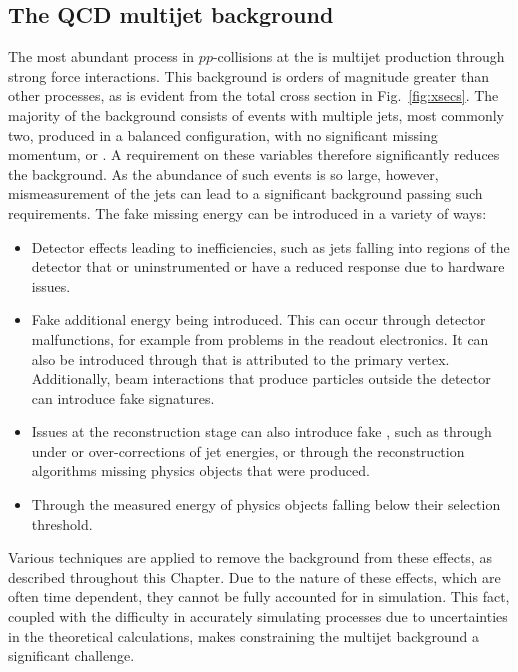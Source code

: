 \subsection{The QCD multijet background}
\label{sec:qcdMultijet}

The most abundant \SM process in $pp$-collisions at the \LHC is \QCD
multijet production through strong force interactions. This background
is orders of magnitude greater than other processes, as is evident
from the total \LHC cross section in Fig.~\ref{fig:xsecs}. The
majority of the \QCD background consists of events with multiple jets,
most commonly two, produced in a balanced configuration, with no
significant missing momentum, \MET or \MHT. A requirement on these
variables therefore significantly reduces the background. As
the abundance of such events is so large, however, mismeasurement of
the jets can lead to a significant \QCD background passing such
requirements. The fake missing energy can be introduced in a variety
of ways:
\begin{itemize}
\item{Detector effects leading to inefficiencies, such as jets
falling into regions of the detector that or uninstrumented or have a
reduced response due to hardware issues.}
\item{Fake additional energy being introduced. This can occur through
detector malfunctions, for example from problems in the readout
electronics. It can also be introduced through \PU that is attributed to
the primary vertex. Additionally, beam interactions that produce
particles outside the detector can introduce fake \MET signatures.}
\item{Issues at the reconstruction stage can also introduce fake \MET,
such as through under or over-corrections of jet energies, or through
the reconstruction algorithms missing physics objects that were
produced.}
\item{Through the measured energy of physics objects falling below
their selection threshold. }
\end{itemize}

Various techniques are applied to remove the background from these
effects, as described throughout this Chapter. Due to the nature of
these effects, which are often time dependent, they cannot be fully
accounted for in simulation. This fact, coupled with the difficulty in
accurately simulating \QCD processes due to uncertainties in the
theoretical calculations, makes constraining the multijet background a
significant challenge. 

